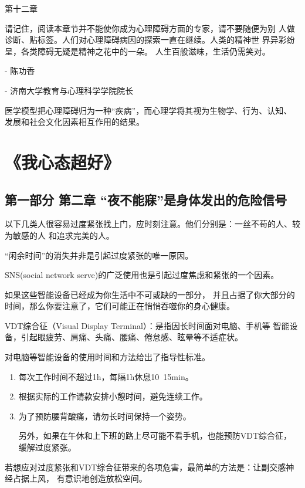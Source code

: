 \documentclass[12pt,a4paper]{article}
\newcommand{\upmean}[1]{\raisebox{0.25ex}{\scriptsize #1}} %
\begin{document}
第十二章

请记住，阅读本章节并不能使你成为心理障碍方面的专家，请不要随便为别
人做诊断、贴标签。人们对心理障碍病因的探索一直在继续。人类的精神世
界异彩纷呈，各类障碍无疑是精神之花中的一朵。
人生百般滋味，生活仍需笑对。

\hfill - 陈功香

\hfill - 济南大学教育与心理科学学院院长

医学模型把心理障碍归为一种“疾病”，而心理学将其视为生物学、行为、认知、
发展和社会文化因素相互作用的结果。


\section*{《我心态超好》}




\subsection*{第一部分 第二章 “夜不能寐”是身体发出的危险信号 }

以下几类人很容易过度紧张找上门，应时刻注意。他们分别是：一丝不苟的人、较为敏感的人
和追求完美的人。

“闲余时间”的消失并非是引起过度紧张的唯一原因。

SNS(social network serve)的广泛使用也是引起过度焦虑和紧张的一个因素。

如果这些智能设备\upmean{电脑、手机}已经成为你生活中不可或缺的一部分，
并且占据了你大部分的时间，那么你要注意了，它们可能正在悄悄吞噬你的身心健康。

VDT综合征（Visual Display Terminal）：是指因长时间面对电脑、手机等
智能设备，引起眼疲劳、肩痛、头痛、腰痛、倦怠感、眩晕等不适症状。

对电脑等智能设备的使用时间和方法给出了指导性标准。
\begin{enumerate}
    \item 每次工作时间不超过1h，每隔1h休息10~15min。
    \item 根据实际的工作请款安排小憩时间，避免连续工作。
    \item 为了预防腰背酸痛，请勿长时间保持一个姿势。
    
    另外，如果在午休和上下班的路上尽可能不看手机，也能预防VDT综合征，
    缓解过度紧张。
\end{enumerate}

若想应对过度紧张和VDT综合征带来的各项危害，最简单的方法是：让副交感神经占据上风，
有意识地创造放松空间。
\end{document}
